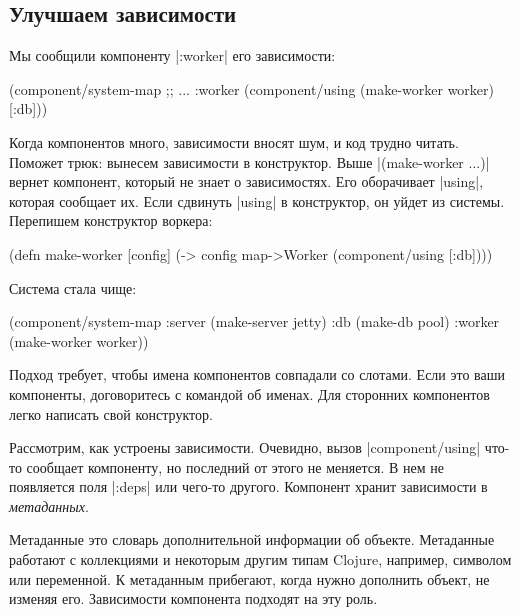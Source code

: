 \subsection{Улучшаем зависимости}

Мы сообщили компоненту \spverb|:worker| его зависимости:

\begin{english}
  \begin{clojure}
(component/system-map
 ;; ...
 :worker (component/using
          (make-worker worker) [:db]))
  \end{clojure}
\end{english}

Когда компонентов много, зависимости вносят шум, и код трудно читать. Поможет
трюк: вынесем зависимости в конструктор. Выше \spverb|(make-worker {...})|
вернет компонент, который не знает о зависимостях. Его оборачивает
\spverb|using|, которая сообщает их. Если сдвинуть \spverb|using| в конструктор,
он уйдет из системы. Перепишем конструктор воркера:

\begin{english}
  \begin{clojure}
(defn make-worker [config]
  (-> config
      map->Worker
      (component/using [:db])))
  \end{clojure}
\end{english}

Система стала чище:

\begin{english}
  \begin{clojure}
(component/system-map
 :server (make-server jetty)
 :db     (make-db pool)
 :worker (make-worker worker))
  \end{clojure}
\end{english}

Подход требует, чтобы имена компонентов совпадали со слотами. Если это ваши
компоненты, договоритесь с командой об именах. Для сторонних компонентов легко
написать свой конструктор.

Рассмотрим, как устроены зависимости. Очевидно, вызов \spverb|component/using|
что-то сообщает компоненту, но последний от этого не меняется. В нем не
появляется поля \spverb|:deps| или чего-то другого. Компонент хранит зависимости
в \emph{метаданных}.

Метаданные это словарь дополнительной информации об объекте. Метаданные работают
с коллекциями и некоторым другим типам Clojure, например, символом или
переменной. К метаданным прибегают, когда нужно дополнить объект, не изменяя
его. Зависимости компонента подходят на эту роль.

